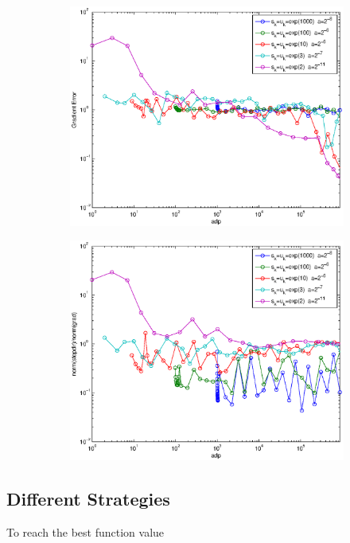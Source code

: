 \documentclass[12pt]{article}
\begin{document}
\begin{figure}[H]
	\begin{subfigure}[b]{.5\linewidth}
		        \includegraphics[width=4in]{Figures/19-1-3.eps}
	\end{subfigure}%
	\begin{subfigure}[b]{.5\linewidth}
		        \includegraphics[width=4in]{Figures/19-1-4.eps}
	\end{subfigure}%
	\end{figure}
	
	\subsection{Different Strategies}
	To reach the best function value
\end{document}
